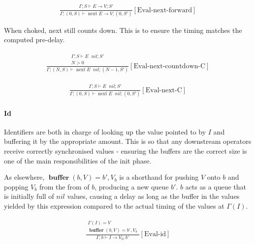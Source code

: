 \documentclass{scrartcl}
\DeclareMathOperator{\nextop}{next}
\DeclareMathOperator{\ceval}{\overset{C}{\rightarrow}}
\DeclareMathOperator{\buffer}{\mathbf{buffer}}
\begin{document}
    \begin{align*}
    \frac{
        \begin{matrix}
        \Gamma; S \vdash E \rightarrow V; S'
        \end{matrix}
    }{
        \Gamma; (0, S) \vdash \nextop E \rightarrow V; (0, S')
    }[\text{Eval-next-forward}]
    \end{align*}
    
    When choked, next still counts down. This is to ensure the timing matches the computed pre-delay.
    
    \begin{align*}
    \frac{
        \begin{matrix}
        \Gamma; S \vdash E \ceval nil; S' \\
        N > 0
        \end{matrix}
    }{
        \Gamma; (N, S) \vdash \nextop E \ceval nil; (N-1, S')
    }[\text{Eval-next-countdown-C}]
    \end{align*}
    
    \begin{align*}
    \frac{
        \begin{matrix}
        \Gamma; S \vdash E \ceval nil; S'
        \end{matrix}
    }{
        \Gamma; (0, S) \vdash \nextop E \ceval nil; (0, S')
    }[\text{Eval-next-C}]
    \end{align*}
    
    \paragraph{Id}
    
    Identifiers are both in charge of looking up the value pointed to by $I$ and buffering it by the appropriate amount. This is so that any downstream operators receive correctly synchronised values - ensuring the buffers are the correct size is one of the main responsibilities of the init phase.
    
    As elsewhere, $\buffer(b, V) = b', V_b$ is a shorthand for pushing $V$ onto $b$ and popping $V_b$ from the from of $b$, producing a new queue $b'$. $b$ acts as a queue that is initially full of $nil$ values, causing a delay as long as the buffer in the values yielded by this expression compared to the actual timing of the values at $\Gamma(I)$. 
    
    \begin{align*}
    \frac{
        \begin{matrix}
        \Gamma(I) = V \\
        \buffer(b, V) = b', V_b
        \end{matrix}
    }{
        \Gamma, b \vdash I \rightarrow V_b; b'
    }[\text{Eval-id}]
    \end{align*}
    
\end{document}
